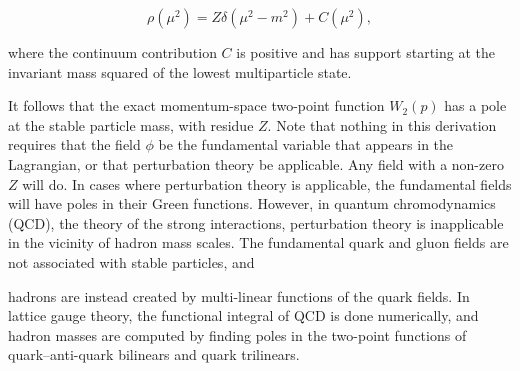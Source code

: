 \[
\rho(\mu^2)=Z\delta(\mu^2-m^2)+C(\mu^2),
\]

where the continuum contribution $C$ is positive and has support starting at the invariant
mass squared of the lowest multiparticle state.

It follows that the exact momentum-space two-point function $W_2(p)$ has a pole at
the stable particle mass, with residue $Z$. Note that nothing in this derivation requires
that the field $\phi$ be the fundamental variable that appears in the Lagrangian, or that
perturbation theory be applicable. Any field with a non-zero $Z$ will do. In cases where
perturbation theory is applicable, the fundamental fields will have poles in their Green
functions. However, in quantum chromodynamics (QCD), the theory of the strong
interactions, perturbation theory is inapplicable in the vicinity of hadron mass scales.
The fundamental quark and gluon fields are not associated with stable particles, and

hadrons are instead created by multi-linear functions of the quark fields. In lattice
gauge theory, the functional integral of QCD is done numerically, and hadron masses
are computed by finding poles in the two-point functions of quark--anti-quark bilinears
and quark trilinears.

